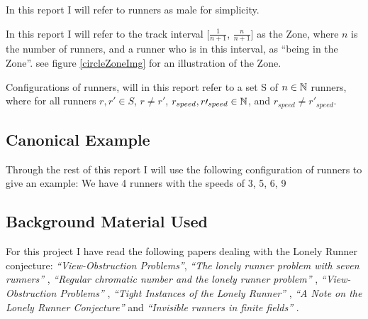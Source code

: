 In this report I will refer to runners as male for simplicity.

\begin{defi}
\label{def:theZone}
In this report I will refer to the track interval [$\frac{1}{n + 1}$, $\frac{n}{n+1}$] as the Zone, where $n$ is the number of runners, and a runner who is in this interval, as ``being in the Zone''. see figure \ref{circleZoneImg} for an illustration of the Zone.
\end{defi}

\begin{defi}
\label{def:config}
Configurations of runners, will in this report refer to a set S of $n \in \mathbb{N}$ runners, where for all runners $r, r\prime \in S$, $r \neq r\prime$, $r_{speed}, r\prime_{speed} \in \mathbb{N}$, and $r_{speed} \neq r\prime_{speed}$.
\end{defi}

\subsection{Canonical Example}
Through the rest of this report I will use the following configuration
of runners to give an example:
We have 4 runners with the speeds of 3, 5, 6, 9

\subsection{Background Material Used}
\label{background}
For this project I have read the following papers dealing with the Lonely Runner conjecture: \emph{``View-Obstruction Problems''}\cite{Bienia97flows.view-obstructions}, \emph{``The lonely runner problem with seven runners''} \cite{serra_thelonely}, \emph{``Regular chromatic number and the lonely runner problem''} \cite{Barajas2007479}, \emph{``View-Obstruction Problems''} \cite{springerlink:10.1007/BF01832623}, \emph{``Tight Instances of the Lonely Runner''} \cite{Goddyn96tightinstances}, \emph{``A Note on the Lonely Runner Conjecture''} \cite{ANote} and \emph{``Invisible runners in finite fields''} \cite{invis}.

